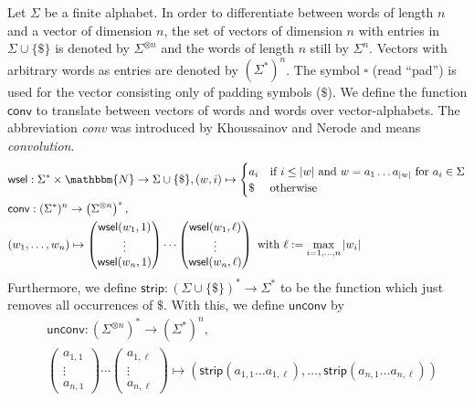 \documentclass{LMCS}
\newcommand{\nat}{\mathbbm{N}}
\newcommand{\pad}{\square}
\newcommand{\alphVector}[2]{#1^{\otimes #2}}
\newcommand{\alphVectorS}[2]{\left(#1^{\otimes #2}\right)^*}
\newcommand{\bindL}{\mathsf{conv}}
\newcommand{\unbind}{\mathsf{unconv}}
\newcommand{\wsel}{\mathsf{wsel}}
\newcommand{\strip}{\mathsf{strip}}
\begin{document}
\begin{defi}\label{def:PaddingAndWordVectors}
	Let $\Sigma$ be a finite alphabet. In order to differentiate between words
of length $n$ and a vector of dimension $n$, the set of vectors of dimension
$n$ with entries in $\Sigma \cup \{\$\}$ is denoted by $\alphVector{\Sigma}{n}$
and the words of length $n$ still by $\Sigma^n$. Vectors with arbitrary words
as entries are denoted by $(\Sigma^*)^n$. The symbol $\pad$ (read ``pad'') is 
used for the vector consisting only of padding symbols ($\$$). We define the 
function $\bindL$ to translate between vectors of words and words over
vector-alphabets. The abbreviation \emph{conv} was introduced by Khoussainov and
Nerode and means \emph{convolution}.
\begin{align*}
	&\wsel: \Sigma^* \times \nat \to \Sigma \cup \{\$\}, (w,i) \mapsto
\begin{cases}
	a_i & \text{if $i \le |w|$ and $w = a_1 \ldots a_{|w|}$ for $a_i \in
\Sigma$} \\
	\$ & \text{otherwise}
\end{cases} \\
	&\bindL: (\Sigma^*)^n \to \alphVectorS{\Sigma}{n}, \\ 
&(w_1,\ldots,w_n) \mapsto
\left(\begin{matrix} \wsel(w_1,1) \\ \vdots \\ \wsel(w_n,1)\end{matrix}\right)
\cdots \left(\begin{matrix} \wsel(w_1,\ell) \\ \vdots \\
\wsel(w_n,\ell)\end{matrix}\right) \text{ with } \ell := \max_{i = 1,\ldots,n}
|w_i| \\
\end{align*}
	Furthermore, we define $\strip: (\Sigma \cup \{\$\})^* \to \Sigma^*$ to be
the function which just removes all occurrences of $\$$. With this, we define
$\unbind$ by
\begin{align*}
 & \unbind: \alphVectorS{\Sigma}{n} \to (\Sigma^*)^n , \\
 & 	\left(\begin{matrix} a_{1,1} \\ \vdots \\ a_{n,1}\end{matrix}\right) 
	\cdots 
	\left(\begin{matrix} a_{1,\ell} \\ \vdots \\ a_{n,\ell}\end{matrix}\right)
	\mapsto (\strip(a_{1,1}\ldots a_{1,\ell}), \ldots, \strip(a_{n,1}\ldots
a_{n,\ell}))
\end{align*}


\end{defi}
\end{document}
